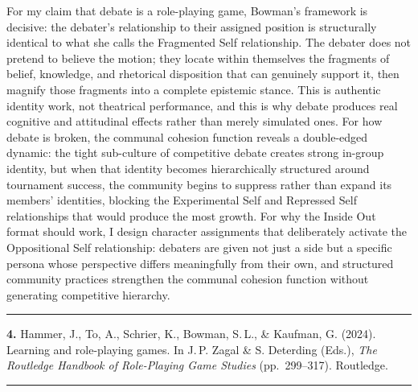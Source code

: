 \documentclass[11pt, a4paper]{article}
\newcommand{\entry}[3]{%
  \vspace{1.8em}
  {\color{rulegray}\rule{\linewidth}{0.4pt}}
  \vspace{0.5em}

  \noindent
  {\large\bfseries\color{accent}#1.}\enspace
  {\normalsize #2}%
  \enspace{\small\scshape\color{taggray}[#3]}

  \vspace{0.35em}
  {\color{accent}\rule{\linewidth}{1.2pt}}
  \vspace{0.2em}
}
\begin{document}
For my claim that debate is a role-playing game, Bowman's framework is
decisive: the debater's relationship to their assigned position is structurally
identical to what she calls the Fragmented Self relationship. The debater does
not pretend to believe the motion; they locate within themselves the fragments
of belief, knowledge, and rhetorical disposition that can genuinely support it,
then magnify those fragments into a complete epistemic stance. This is authentic
identity work, not theatrical performance, and this is why debate produces
real cognitive and attitudinal effects rather than merely simulated ones.
For how debate is broken, the communal cohesion function reveals a
double-edged dynamic: the tight sub-culture of competitive debate creates
strong in-group identity, but when that identity becomes hierarchically
structured around tournament success, the community begins to suppress rather
than expand its members' identities, blocking the Experimental Self and
Repressed Self relationships that would produce the most growth. For why the
Inside Out format should work, I design character assignments that deliberately
activate the Oppositional Self relationship: debaters are given not just a side
but a specific persona whose perspective differs meaningfully from their own,
and structured community practices strengthen the communal cohesion function
without generating competitive hierarchy.

\entry{4}{Hammer, J., To, A., Schrier, K., Bowman, S.\,L., \& Kaufman, G. (2024).
Learning and role-playing games. In J.\,P. Zagal \& S. Deterding (Eds.),
\textit{The Routledge Handbook of Role-Playing Game Studies} (pp.~299--317).
Routledge.}{Theoretical Framework}
\end{document}
